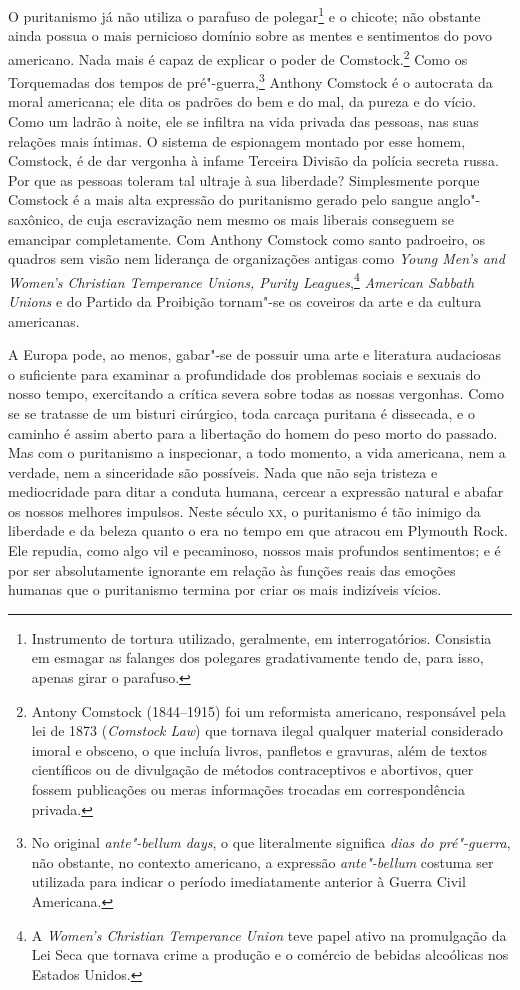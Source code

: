 O puritanismo já não utiliza o parafuso de polegar\footnote{Instrumento
  de tortura utilizado, geralmente, em interrogatórios. Consistia em
  esmagar as falanges dos polegares gradativamente tendo de, para isso,
  apenas girar o parafuso.} e o chicote; não obstante ainda possua o
mais pernicioso domínio sobre as mentes e sentimentos do povo americano.
Nada mais é capaz de explicar o poder de Comstock.\footnote{Antony
  Comstock (1844--1915) foi um reformista americano, responsável pela lei
  de 1873 (\textit{Comstock Law}) que tornava ilegal qualquer material
  considerado imoral e obsceno, o que incluía livros, panfletos e gravuras,
  além de textos científicos ou de divulgação de métodos contraceptivos
  e abortivos, quer fossem publicações ou meras informações trocadas em
  correspondência privada.} Como os Torquemadas dos tempos de
pré"-guerra,\footnote{No original \textit{ante"-bellum days}, o que
  literalmente significa \textit{dias do pré"-guerra}, não obstante, no
  contexto americano, a expressão \textit{ante"-bellum} costuma ser
  utilizada para indicar o período imediatamente anterior à Guerra Civil
  Americana.} Anthony Comstock é o autocrata da moral americana; ele
dita os padrões do bem e do mal, da pureza e do vício. Como um ladrão à
noite, ele se infiltra na vida privada das pessoas, nas suas relações
mais íntimas. O sistema de espionagem montado por esse homem, Comstock,
é de dar vergonha à infame Terceira Divisão da polícia secreta russa.
Por que as pessoas toleram tal ultraje à sua liberdade? Simplesmente
porque Comstock é a mais alta expressão do puritanismo gerado pelo
sangue anglo"-saxônico, de cuja escravização nem mesmo os mais liberais
conseguem se emancipar completamente. Com Anthony Comstock como santo
padroeiro, os quadros sem visão nem liderança de organizações antigas 
como \textit{Young Men's and Women's Christian Temperance Unions, Purity
Leagues},\footnote{A \textit{Women's Christian Temperance Union} teve papel
  ativo na promulgação da Lei Seca que tornava
  crime a produção e o comércio de bebidas alcoólicas nos Estados
  Unidos.} \textit{American Sabbath Unions} e do Partido da Proibição tornam"-se
os coveiros da arte e da cultura americanas.

A Europa pode, ao menos, gabar"-se de possuir uma arte e literatura audaciosas
o suficiente para examinar a profundidade dos problemas sociais e sexuais do
nosso tempo, exercitando a crítica severa sobre todas as nossas
vergonhas. Como se se tratasse de um bisturi cirúrgico, toda carcaça
puritana é dissecada, e o caminho é assim aberto para a libertação do
homem do peso morto do passado. Mas com o puritanismo a inspecionar, a
todo momento, a vida americana, nem a verdade, nem a sinceridade são
possíveis. Nada que não seja tristeza e mediocridade para ditar a
conduta humana, cercear a expressão natural e abafar os nossos melhores
impulsos. Neste século \textsc{xx}, o puritanismo é tão inimigo da liberdade e da
beleza quanto o era no tempo em que atracou em Plymouth Rock. Ele
repudia, como algo vil e pecaminoso, nossos mais profundos sentimentos;
e é por ser absolutamente ignorante em relação às funções reais das
emoções humanas que o puritanismo termina por criar os mais indizíveis
vícios.


